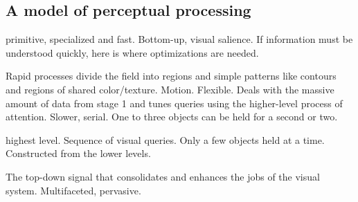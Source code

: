 \begin{mdframed}
\begin{multicols}{2}
    \subsection{A model of perceptual processing}
\begin{compactdesc}
\item[Stage 1: Parallel processing, low-level properties] primitive, specialized
    and fast. Bottom-up, visual salience. If information must be understood
    quickly, here is where optimizations are needed.
\item[Stage 2: Pattern Perception] Rapid processes divide the field into
    regions and simple patterns like contours and regions of shared
    color/texture. Motion. Flexible. Deals with the massive amount of data
    from stage 1 and tunes queries using the higher-level process of attention.
    Slower, serial. One to three objects can be held for a second or two.
\item[Stage 3: Visual working meory] highest level. Sequence of visual
    queries. Only a few objects held at a time. Constructed from the lower
    levels.
\item[Attention] The top-down signal that consolidates and enhances the jobs
    of the visual system. Multifaceted, pervasive.
\end{compactdesc}
\end{multicols}\end{mdframed}




